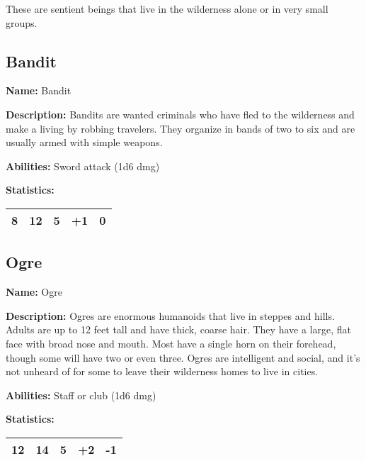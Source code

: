 \begin{multicols}{2}
These are sentient beings that live in the wilderness alone or
in very small groups.

\subsection{Bandit}

\textbf{Name:} Bandit

\textbf{Description:} Bandits are wanted criminals who have fled to the wilderness and make
a living by robbing travelers. They organize in bands of two to six and are usually armed with
simple weapons.

\textbf{Abilities:} Sword attack (1d6 dmg)

\textbf{Statistics:}

\begin{center}
{
\begin{xtabular}{|l|l|l|l|l|}
8 & 12 & 5 & +1 & 0 \\
\hline
\end{xtabular}
}
\end{center}

\subsection{Ogre}

\textbf{Name:} Ogre

\textbf{Description:} Ogres are enormous humanoids that live in steppes and hills. Adults
are up to 12 feet tall and have thick, coarse hair. They have a large, flat face with broad
nose and mouth. Most have a single horn on their forehead, though some will have two or even
three. Ogres are intelligent and social, and it's not unheard of for some to leave their
wilderness homes to live in cities.

\textbf{Abilities:} Staff or club (1d6 dmg)

\textbf{Statistics:}

\begin{center}
{
\begin{xtabular}{|l|l|l|l|l|}
12 & 14 & 5 & +2 & -1 \\
\hline
\end{xtabular}
}
\end{center}


\end{multicols}
